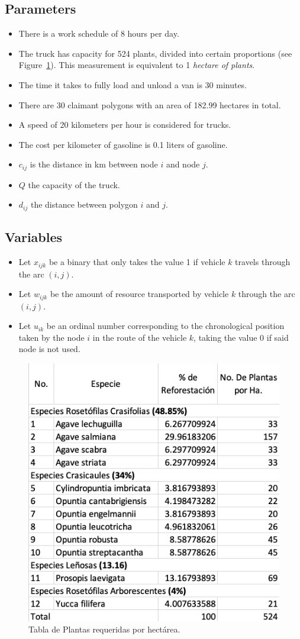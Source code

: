 \documentclass{amsart}
\begin{document}
        \subsection{Parameters}        
        \begin{itemize}
            \item There is a work schedule of 8 hours per day.
            \item The truck has capacity for 524 plants, divided into certain proportions (see Figure~\ref{fig:tablaDePlantas}). This measurement is equivalent to 1 \textit{hectare of plants}.
            \item The time it takes to fully load and unload a van is 30 minutes.
            \item There are 30 claimant polygons with an area of 182.99 hectares in total.
            \item A speed of 20 kilometers per hour is considered for trucks.
            \item The cost per kilometer of gasoline is 0.1 liters of gasoline.
            \item \(c_{ij}\) is the distance in km between node $i$ and node $j$.
            \item \(Q\) the capacity of the truck.
            \item \(d_{ij}\) the distance between polygon $i$ and $j$.
        \end{itemize}
        
        \subsection{Variables}
        \begin{itemize}
            \item Let $x_{ijk}$ be a binary that only takes the value 1 if vehicle $k$ travels through the arc $(i,j)$.
            \item Let $w_{ijk}$ be the amount of resource transported by vehicle $k$ through the arc $(i,j)$.
            \item Let $u_{ik}$ be an ordinal number corresponding to the chronological position taken by the node $i$ in the route of the vehicle $k$, taking the value 0 if said node is not used.
        \end{itemize}

        \begin{figure}[ht]
            \centering
            \includegraphics[width=0.35\linewidth]{Sources/TablaDePlantas.png}
            \caption{Tabla de Plantas requeridas por hectárea.}\label{fig:tablaDePlantas}
        \end{figure}
        
\end{document}

